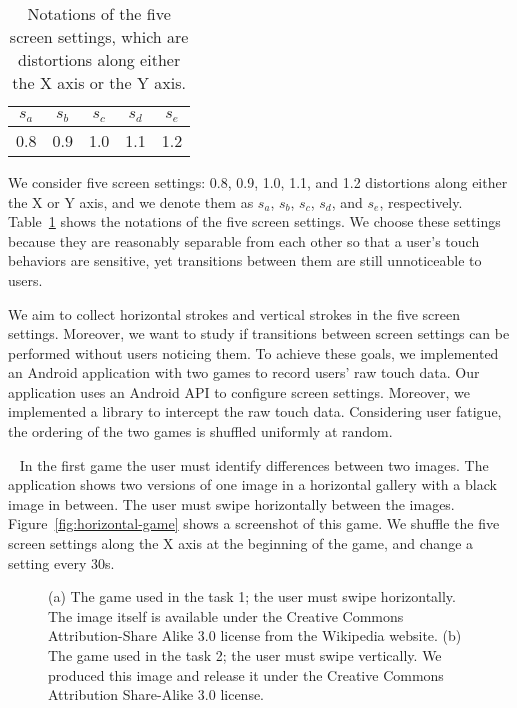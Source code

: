 \documentclass{sig-alternate-05-2015}
\newcommand{\myparatight}[1]{\smallskip\noindent{\bf {#1}:}~}
\begin{document}
\begin{table}[!t]\renewcommand{\arraystretch}{1}
\centering
\caption{Notations of the five screen settings, which are distortions along either the X axis or the Y axis.}
\begin{tabular}{|c|c|c|c|c|} \hline
{\small $s_a$}&{\small $s_b$}&{\small $s_c$}&{\small $s_d$}&{\small $s_e$} \\ \hline
{\small 0.8}&{\small 0.9}&{\small 1.0}&{\small 1.1}&{\small 1.2} \\ \hline
\end{tabular}
\label{notation}
\end{table}



We consider five screen settings: 0.8, 0.9, 1.0, 1.1, and 1.2 distortions along either
the X or Y axis, and we denote them as $s_a$, $s_b$, $s_c$, $s_d$, and $s_e$, respectively. 
Table~\ref{notation} shows the notations of the five screen settings. 
We choose these settings because they  are reasonably separable from each other so that 
a user's touch behaviors are sensitive, yet transitions between them are still
unnoticeable to users.  



We aim to collect horizontal strokes and vertical strokes in the five screen settings.
Moreover, we want to study if transitions between screen settings can be 
performed without users noticing them.   
To achieve these goals, we implemented an Android application with two games to 
record users' raw touch data.  
Our application uses an Android API  to configure screen settings.
Moreover, we implemented a library to intercept the raw touch data. 
Considering user fatigue, the ordering of the two games  is shuffled uniformly at random.


\myparatight{Task 1, horizontal strokes} In the first game the user must identify differences between two images. The
application shows two versions of one image in a horizontal gallery with a black
image in between. The user must swipe  horizontally between the images. 
Figure~\ref{fig:horizontal-game} shows a screenshot of this game. 
We shuffle the five screen settings along the X axis at the beginning of the game, and change a setting every 30s. 

\begin{figure}[!t]
\centering
{}
\caption{(a) The game used in the task 1; the user must swipe
horizontally. The image itself is available under the Creative Commons
Attribution-Share Alike 3.0 license from the Wikipedia website. 
(b) The game used in the task 2; the user must swipe vertically.
We produced this image and release it under the Creative Commons Attribution
Share-Alike 3.0 license.}
\vspace{6mm}
\end{figure}
\end{document}
